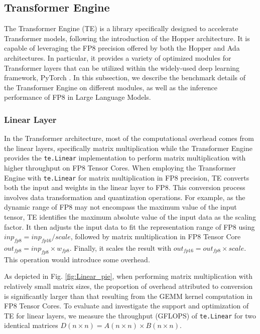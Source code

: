 \subsection{Transformer Engine} The Transformer Engine (TE) \cite{te} is a library specifically designed to accelerate Transformer models\cite{vaswani2017attention}, following the introduction of the Hopper architecture. It is capable of leveraging the FP8 precision offered by both the Hopper and Ada architectures. In particular, it provides a variety of optimized modules for Transformer layers that can be utilized within the widely-used deep learning framework, PyTorch \cite{pytorch}. In this subsection, we describe the benchmark details of the Transformer Engine on different modules, as well as the inference performance of FP8 in Large Language Models.

\subsubsection{Linear Layer} In the Transformer architecture, most of the computational overhead comes from the linear layers, specifically matrix multiplication while the Transformer Engine provides the \texttt{te.Linear} implementation to perform matrix multiplication with higher throughput on FP8 Tensor Cores. When employing the Transformer Engine with \texttt{te.Linear} for matrix multiplication in FP8 precision, TE converts both the input and weights in the linear layer to FP8. This conversion process involves data transformation and quantization operations. For example, as the dynamic range of FP8 may not encompass the maximum value of the input tensor, TE identifies the maximum absolute value of the input data as the scaling factor. It then adjusts the input data to fit the representation range of FP8 using $inp_{fp8} = inp_{fp16} / scale$, followed by matrix multiplication in FP8 Tensor Core $out_{fp8} = inp_{fp8} \times w_{fp8}$. Finally, it scales the result with $out_{fp16} = out_{fp8} \times scale$. This operation would introduce some overhead.

As depicted in Fig. \ref{fig:Linear_pie}, when performing matrix multiplication with relatively small matrix sizes, the proportion of overhead attributed to conversion is significantly larger than that resulting from the GEMM kernel computation in FP8 Tensor Cores. To evaluate and investigate the support and optimization of TE for linear layers, we measure the throughput (GFLOPS) of \texttt{te.Linear} for two identical matrices $D(n \times n) = A(n \times n) \times B(n \times n)$. 

